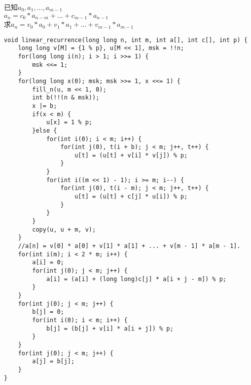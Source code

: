 已知$a_0, a_1, ..., a_{m - 1}$\\
	$a_n = c_0 * a_{n - m} + ... + c_{m - 1} * a_{n - 1}$\\
	求$a_n = v_0 * a_0 + v_1 * a_1 + ... + v_{m - 1} * a_{m - 1}$\\
\begin{lstlisting}
void linear_recurrence(long long n, int m, int a[], int c[], int p) {
	long long v[M] = {1 % p}, u[M << 1], msk = !!n;
	for(long long i(n); i > 1; i >>= 1) {
		msk <<= 1;
	}
	for(long long x(0); msk; msk >>= 1, x <<= 1) {
		fill_n(u, m << 1, 0);
		int b(!!(n & msk));
		x |= b;
		if(x < m) {
			u[x] = 1 % p;
		}else {
			for(int i(0); i < m; i++) {
				for(int j(0), t(i + b); j < m; j++, t++) {
					u[t] = (u[t] + v[i] * v[j]) % p;
				}
			}
			for(int i((m << 1) - 1); i >= m; i--) {
				for(int j(0), t(i - m); j < m; j++, t++) {
					u[t] = (u[t] + c[j] * u[i]) % p;
				}
			}
		}
		copy(u, u + m, v);
	}
	//a[n] = v[0] * a[0] + v[1] * a[1] + ... + v[m - 1] * a[m - 1].
	for(int i(m); i < 2 * m; i++) {
		a[i] = 0;
		for(int j(0); j < m; j++) {
			a[i] = (a[i] + (long long)c[j] * a[i + j - m]) % p;
		}
	}
	for(int j(0); j < m; j++) {
		b[j] = 0;
		for(int i(0); i < m; i++) {
			b[j] = (b[j] + v[i] * a[i + j]) % p;
		}
	}
	for(int j(0); j < m; j++) {
		a[j] = b[j];
	}
}
\end{lstlisting}
